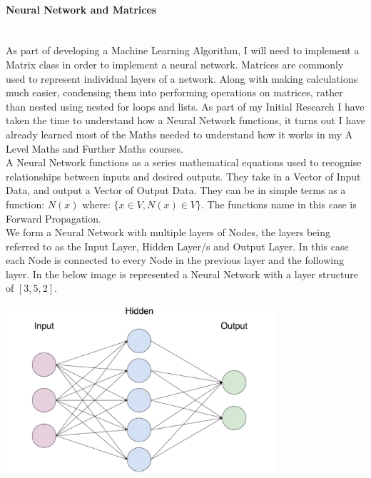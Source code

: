 \begin{flushleft}
                    \paragraph{Neural Network and Matrices} \mbox{} \\
                        As part of developing a Machine Learning Algorithm, I will need to implement a Matrix class in order to
                        implement a neural network. Matrices are commonly used to represent individual layers of a network. Along
                        with making calculations much easier, condensing them into performing operations on matrices, rather than
                        nested using nested for loops and lists. As part of my Initial Research I have taken the time to understand
                        how a Neural Network functions, it turns out I have already learned most of the Maths needed to understand
                        how it works in my A Level Maths and Further Maths courses. \\
                        \vspace{0.2cm}
                        A Neural Network functions as a series mathematical equations used to recognise relationships between inputs
                        and desired outputs. They take in a Vector of Input Data, and output a Vector of Output Data. They can be
                        in simple terms as a function: $N(x)$ where: $\{x \in V, N(x) \in V\}$. The functions name in this case is
                        Forward Propagation. \\
                        \vspace{0.2cm}
                        We form a Neural Network with multiple layers of Nodes, the layers being referred to as the Input Layer, 
                        Hidden Layer/s and Output Layer. In this case each Node is connected to every Node in the previous layer and
                        the following layer. In the below image is represented a Neural Network with a layer structure of $[3, 5, 2]$.

                        \vspace{0.1cm}
                        \centerline{\includegraphics[width=10cm]{Images/InitialResearch/NeuralNetworkExample.png}}


\end{flushleft}
